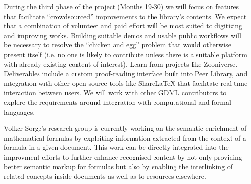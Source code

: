 \documentclass{article}
\begin{document}
During the third phase of the project (Months 19-30) we will focus on
features that facilitate ``crowdsourced'' improvements to the
library's contents.  We expect that a combination of volunteer and
paid effort will be most suited to digitizing and improving works.
Building suitable demos and usable public workflows will be necessary
to resolve the ``chicken and egg'' problem that would otherwise
present itself (i.e. no one is likely to contribute unless there is a
suitable platform with already-existing content of interest).  Learn from projects like Zooniverse.
%
Deliverables include a custom proof-reading interface built into Peer
Library, and integration with other open source tools like ShareLaTeX
that facilitate real-time interaction between users.  We will work with other GDML contributors to 
explore the requirements around integration with computational and formal languages.

Volker Sorge's research group is currently working on the semantic enrichment of
mathematical formulas by exploiting information extracted from the context of a
formula in a given document. This work can be directly integrated into the
improvment efforts to further enhance recognised content by not only providing
better semantic markup for formulas but also by enabling the interlinking of
related concepts inside documents as well as to resources elsewhere.
\end{document}
